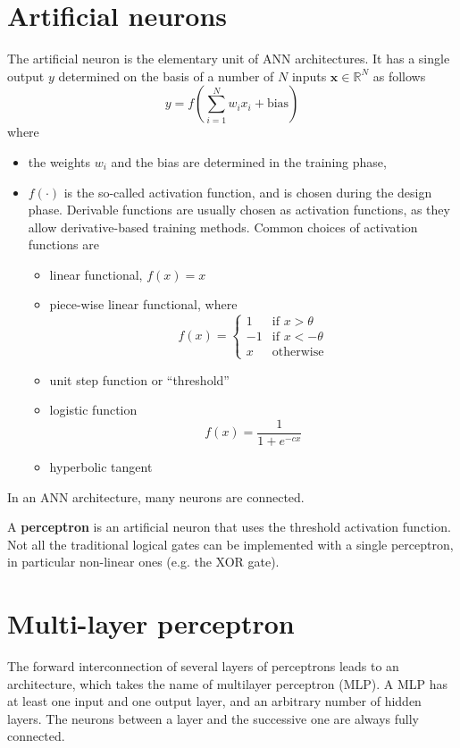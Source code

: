 \documentclass[oneside,onecolumn]{report}
\begin{document}
\section{Artificial neurons}
The artificial neuron is the elementary unit of ANN architectures.
It has a single output $y$ determined on the basis of a number of $N$ inputs $\bm x \in \mathbb R^N$ as follows
$$ y = f\left( \sum_{i = 1}^N w_i x_i + \text{bias} \right) $$
where
\begin{itemize}
    \item the weights $w_i$ and the bias are determined in the training phase,
    \item $f(\cdot)$ is the so-called activation function, and is chosen during the design phase.
    Derivable functions are usually chosen as activation functions, as they allow derivative-based training methods.
    Common choices of activation functions are
    \begin{itemize}
        \item linear functional, $f(x) = x$
        \item piece-wise linear functional, where
        $$ f(x) = \begin{cases}
            1 & \text{if } x > \theta \\
            -1 & \text{if } x < -\theta \\
            x & \text{otherwise}
        \end{cases} $$
        \item unit step function or ``threshold''
        \item logistic function
        $$ f(x) = \frac{1}{1 + e^{-c x}} $$
        \item hyperbolic tangent
    \end{itemize}
\end{itemize}

In an ANN architecture, many neurons are connected.

A \textbf{perceptron} is an artificial neuron that uses the threshold activation function.
Not all the traditional logical gates can be implemented with a single perceptron, in particular non-linear ones (e.g. the XOR gate).


\section{Multi-layer perceptron}
The forward interconnection of several layers of perceptrons leads to an architecture, which takes the name of multilayer perceptron (MLP).
A MLP has at least one input and one output layer, and an arbitrary number of hidden layers.
The neurons between a layer and the successive one are always fully connected.
\end{document}
